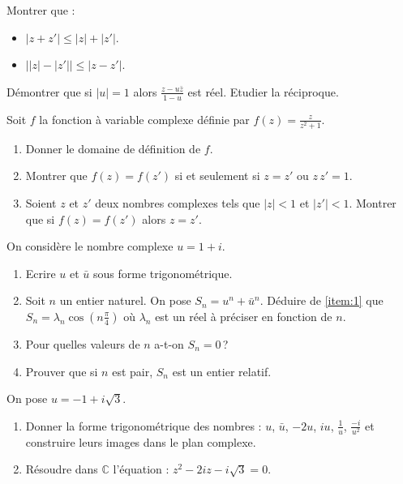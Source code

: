%
\begin{exo}
	Montrer que :
	\begin{itemize}
 		\item $|z + z'| \leq |z| + |z'|$.
		\item $ \left| |z| - |z'| \right| \leq |z - z'|$.
	\end{itemize}
\end{exo}
%
\begin{exo}
	D\'emontrer que si $|u| = 1$ alors $\frac{z - u \bar{z}}{1 - u}$ est r\'eel.
	Etudier la r\'eciproque.
\end{exo}
%
\begin{exo}
	Soit $f$ la fonction \`a variable complexe d\'efinie par $f(z) = \frac{z}{z^2 + 1}$.
	\begin{enumerate}
		\item Donner le domaine de d\'efinition de $f$.
		\item Montrer que $f(z) = f(z')$ si et seulement si $z = z'$ ou $z \, z' = 1$.
		\item Soient $z$ et $z'$ deux nombres complexes tels que $|z| < 1$ et $|z'| < 1$.
			Montrer que si $f(z) = f(z')$ alors $z = z'$.
	\end{enumerate}
\end{exo}
\begin{exo}
      On consid\`ere le nombre complexe $u=1+i$.
      \begin{enumerate}
            \item Ecrire $u$ et $\bar{u}$ sous forme trigonom\'etrique.
                  \label{item:1}
            \item Soit $n$ un entier naturel.
                  On pose $S_n = u^n + \bar{u}^n$.
                  D\'eduire de \ref{item:1} que $S_n = \lambda_n \cos \left( n \frac{\pi}{4} \right)$
                  o\`u $\lambda_n$ est un r\'eel \`a pr\'eciser en fonction de $n$.
            \item Pour quelles valeurs de $n$ a-t-on $S_n = 0$\,?
            \item Prouver que si $n$ est pair, $S_n$ est un entier relatif.
      \end{enumerate}
\end{exo}
%
\begin{exo}
      On pose $u=-1 + i \sqrt{3}$.
      \begin{enumerate}
            \item Donner la forme trigonom\'etrique des nombres :
                  $u$, $\bar{u}$, $-2u$, $iu$, $\frac{1}{u}$, $\frac{-i}{u^2}$
                  et construire leurs images dans le plan complexe.
            \item R\'esoudre dans $\mathbb{C}$ l'\'equation : $z^2 - 2i z - i\sqrt{3} = 0$.
      \end{enumerate}
\end{exo}
